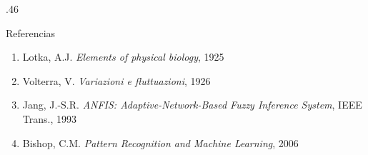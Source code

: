 \documentclass[final]{beamer}
\begin{document}
\begin{frame}[fragile]{}
\begin{columns}
\begin{column}{.46\textwidth}
    \vspace{0.6cm}

    \begin{block}{Referencias}
    \begin{enumerate}
    \item Lotka, A.J. \textit{Elements of physical biology}, 1925
    \item Volterra, V. \textit{Variazioni e fluttuazioni}, 1926
    \item Jang, J.-S.R. \textit{ANFIS: Adaptive-Network-Based Fuzzy Inference System}, IEEE Trans., 1993
    \item Bishop, C.M. \textit{Pattern Recognition and Machine Learning}, 2006
    \end{enumerate}
    \end{block}

    \end{column}
\end{columns}

\end{frame}
\end{document}
